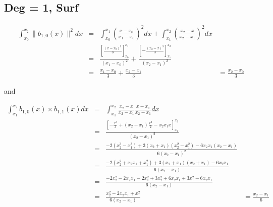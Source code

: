 \documentclass[paper=a4, fontsize=11pt]{book}
\numberwithin{equation}{section}		%
\numberwithin{figure}{section}			%
\numberwithin{table}{section}				%
\begin{document}
\begin{landscape}
\subsection{Deg = 1, Surf}
$$
\begin{array}{llll}
\int_{x_0}^{x_2} \|b_{1,0}(x)\|^2 dx & = & \int_{x_0}^{x_1} \left(\frac{x-x_0}{x_1-x_0}\right)^2  dx + \int_{x_1}^{x_2} \left(\frac{x_2-x}{x_2-x_1}\right)^2  dx\\
& = & \frac{\left[ \frac{(x-x_0)^3}{3} \right]_{x_0}^{x_1} }{(x_1-x_0)^2} + \frac{\left[ -\frac{(x_2-x)^3}{3} \right]_{x_1}^{x_2} }{(x_2-x_1)^2}\\
& = & \frac{x_1-x_0}{3} + \frac{x_2-x_1}{3}
& = \frac{x_2-x_0}{3}
\end{array}
$$

and

$$
\begin{array}{llll}
\int_{x_1}^{x_2} b_{1,0}(x)\times b_{1,1}(x) dx & = & \int_{x_1}^{x_2} \frac{x_2-x}{x_2-x_1}\frac{x-x_1}{x_2-x_1}  dx\\
& = & \frac{\left[ -\frac{x^3}{3} + (x_2+x_1)\frac{x^2}{2} - x_2x_1x \right]_{x_1}^{x_2}}{(x_2-x_1)^2}\\
& = & \frac{ -2(x_2^3-x_1^3) + 3(x_2+x_1)(x_2^2-x_1^2) - 6x_2x_1(x_2-x_1) }{6(x_2-x_1)^2}\\
& = & \frac{ -2(x_2^2+x_2x_1+x_1^2) + 3(x_2+x_1)(x_2+x_1) - 6x_2x_1 }{6(x_2-x_1)}\\
& = & \frac{ -2x_2^2 - 2x_2x_1 - 2x_1^2 + 3x_2^2 + 6x_2x_1 + 3x_1^2 - 6x_2x_1 }{6(x_2-x_1)}\\
& = & \frac{ x_2^2 - 2x_2x_1 + x_1^2 }{6(x_2-x_1)}
& = \frac{x_2 - x_1}{6}
\end{array}
$$


\end{landscape}
\end{document}
